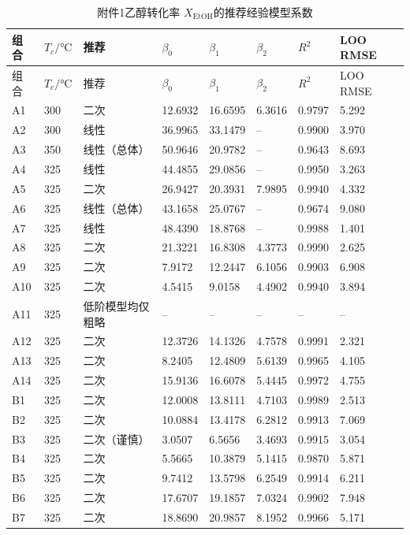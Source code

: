\begin{longtable}{C{0.06\textwidth}C{0.10\textwidth}L{0.15\textwidth}C{0.10\textwidth}C{0.10\textwidth}C{0.10\textwidth}C{0.08\textwidth}C{0.11\textwidth}}
\caption{附件1乙醇转化率 $X_{\mathrm{EtOH}}$的推荐经验模型系数}\label{tab:q1-conversion-recommended}\\
\toprule
组合 & $T_c/\si{\degreeCelsius}$ & 推荐 & $\beta_0$ & $\beta_1$ & $\beta_2$ & $R^2$ & LOO RMSE \\
\midrule
\endfirsthead
\toprule
组合 & $T_c/\si{\degreeCelsius}$ & 推荐 & $\beta_0$ & $\beta_1$ & $\beta_2$ & $R^2$ & LOO RMSE \\
\midrule
\endhead
A1 & 300 & 二次 & 12.6932 & 16.6595 & 6.3616 & 0.9797 & 5.292 \\
A2 & 300 & 线性 & 36.9965 & 33.1479 & -- & 0.9900 & 3.970 \\
A3 & 350 & 线性（总体） & 50.9646 & 20.9782 & -- & 0.9643 & 8.693 \\
A4 & 325 & 线性 & 44.4855 & 29.0856 & -- & 0.9950 & 3.263 \\
A5 & 325 & 二次 & 26.9427 & 20.3931 & 7.9895 & 0.9940 & 4.332 \\
A6 & 325 & 线性（总体） & 43.1658 & 25.0767 & -- & 0.9674 & 9.080 \\
A7 & 325 & 线性 & 48.4390 & 18.8768 & -- & 0.9988 & 1.401 \\
A8 & 325 & 二次 & 21.3221 & 16.8308 & 4.3773 & 0.9990 & 2.625 \\
A9 & 325 & 二次 & 7.9172 & 12.2447 & 6.1056 & 0.9903 & 6.908 \\
A10 & 325 & 二次 & 4.5415 & 9.0158 & 4.4902 & 0.9940 & 3.894 \\
A11 & 325 & 低阶模型均仅粗略 & -- & -- & -- & -- & -- \\
A12 & 325 & 二次 & 12.3726 & 14.1326 & 4.7578 & 0.9991 & 2.321 \\
A13 & 325 & 二次 & 8.2405 & 12.4809 & 5.6139 & 0.9965 & 4.105 \\
A14 & 325 & 二次 & 15.9136 & 16.6078 & 5.4445 & 0.9972 & 4.755 \\
B1 & 325 & 二次 & 12.0008 & 13.8111 & 4.7103 & 0.9989 & 2.513 \\
B2 & 325 & 二次 & 10.0884 & 13.4178 & 6.2812 & 0.9913 & 7.069 \\
B3 & 325 & 二次（谨慎） & 3.0507 & 6.5656 & 3.4693 & 0.9915 & 3.054 \\
B4 & 325 & 二次 & 5.5665 & 10.3879 & 5.1415 & 0.9870 & 5.871 \\
B5 & 325 & 二次 & 9.7412 & 13.5798 & 6.2549 & 0.9914 & 6.211 \\
B6 & 325 & 二次 & 17.6707 & 19.1857 & 7.0324 & 0.9902 & 7.948 \\
B7 & 325 & 二次 & 18.8690 & 20.9857 & 8.1952 & 0.9966 & 5.171 \\
\bottomrule
\end{longtable}
